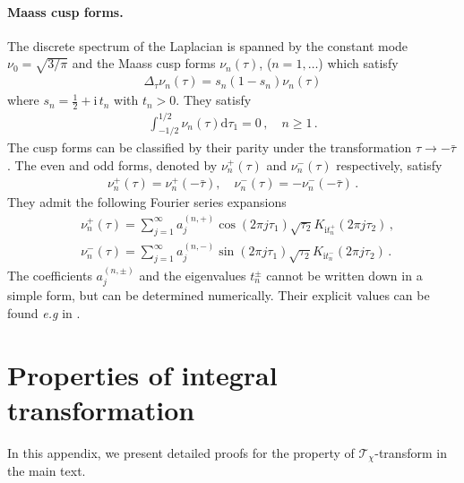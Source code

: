 \documentclass[aps,twocolumn,prl,showpacs,amsmath,amssymb,10pt]{revtex4-2}
\newcommand\ri{{\mathrm{i}}}
\begin{document}
\paragraph{Maass cusp forms.} The discrete spectrum of the Laplacian is spanned by the constant mode  $\nu_0=\sqrt{3/\pi}$ and the Maass cusp forms $\nu_n(\tau)$, ($n=1,\ldots$) which satisfy
\begin{align}
\Delta_{\tau}\nu_n(\tau)=s_n(1-s_n)\nu_n(\tau)
\end{align}
where $s_n=\frac{1}{2}+\ri\,t_n$ with $t_n>0$. They satisfy
\begin{align}
\int_{-1/2}^{1/2}\nu_n(\tau)\mathrm{d}\tau_1=0\,,\quad n\ge 1\,.
\end{align}
The cusp forms can be classified by their parity under the transformation $\tau\to-\bar{\tau}$. The even and odd forms, denoted by $\nu_n^+(\tau)$ and $\nu_n^-(\tau)$ respectively, satisfy
\begin{align}
\nu_n^+(\tau)=\nu_n^+(-\bar{\tau}),\quad \nu_n^-(\tau)=-\nu_n^-(-\bar{\tau})\,.
\end{align}
They admit the following Fourier series expansions
\begin{align}
&\nu_n^+(\tau)=\sum_{j=1}^{\infty}a_j^{(n,+)}\cos(2\pi j\tau_1)\sqrt{\tau_2}K_{\ri t_n^+}(2\pi j\tau_2)\,,\\\nonumber
&\nu_n^-(\tau)=\sum_{j=1}^{\infty}a_j^{(n,-)}\sin(2\pi j\tau_1)\sqrt{\tau_2}K_{\ri t_n^-}(2\pi j\tau_2)\,.
\end{align}
The coefficients $a_j^{(n,\pm)}$ and the eigenvalues $t_n^{\pm}$ cannot be written down in a simple form, but can be determined numerically. Their explicit values can be found \emph{e.g} in \cite{terras2013harmonic}.


\section{Properties of integral transformation}
In this appendix, we present detailed proofs for the property of $\mathcal{T}_{\chi}$-transform in the main text.

\vspace{0.3cm}
\end{document}
